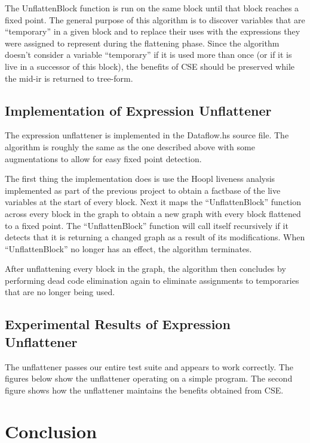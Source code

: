 \documentclass[11pt]{article}
\begin{document}
\noindent The UnflattenBlock function is run on the same block until that block
reaches a fixed point. The general purpose of this algorithm is to
discover variables that are ``temporary'' in a given block and to replace
their uses with the expressions they were assigned to represent during
the flattening phase. Since the algorithm doesn't consider a variable
``temporary'' if it is used more than once (or if it is live in a
successor of this block), the benefits of CSE should be preserved
while the mid-ir is returned to tree-form. 

\subsection{Implementation of Expression Unflattener}

The expression unflattener is implemented in the Dataflow.hs source file. The algorithm is roughly the same as the one described above with some augmentations to allow for easy fixed point detection. 

The first thing the implementation does is use the Hoopl liveness analysis implemented as part of the previous project to obtain a factbase of the live variables at the start of every block. Next it maps the ``UnflattenBlock'' function across every block in the graph to obtain a new graph with every block flattened to a fixed point. The ``UnflattenBlock'' function will call itself recursively if it detects that it is returning a changed graph as a result of its modifications. When ``UnflattenBlock'' no longer has an effect, the algorithm terminates. 

After unflattening every block in the graph, the algorithm then concludes by performing dead code elimination again to eliminate assignments to temporaries that are no longer being used. 

\subsection{Experimental Results of Expression Unflattener}

The unflattener passes our entire test suite and appears to work correctly. The figures below show the unflattener operating on a simple program. The second figure shows how the unflattener maintains the benefits obtained from CSE. 




\section{Conclusion}
\end{document}
